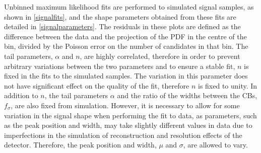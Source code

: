 Unbinned maximum likelihood fits are performed to simulated signal samples, as shown in \fig\ref{signalfits}, and the shape parameters obtained from these fits are detailed in \tab\ref{signalparameters}. The residuals in these plots are defined as the difference between the data and the projection of the PDF in the centre of the bin, divided by the Poisson error on the number of candidates in that bin. The tail parameters, $\alpha$ and $n$, are highly correlated, therefore in order to prevent arbitrary variations between the two parameters and to ensure a stable fit, $n$ is fixed in the fits to the simulated samples. The variation in this parameter does not have significant effect on the quality of the fit, therefore $n$ is fixed to unity. In addition to $n$, the tail parameters $\alpha$ and the ratio of the widths between the CBs, $f_{\sigma}$, are also fixed from simulation. However, it is necessary to allow for some variation in the signal shape when performing the fit to data, as parameters, such as the peak position and width, may take slightly different values in data due to imperfections in the simulation of reconstruction and resolution effects of the \lhcb detector. Therefore, the peak position and width, $\mu$ and $\sigma$, are allowed to vary.

